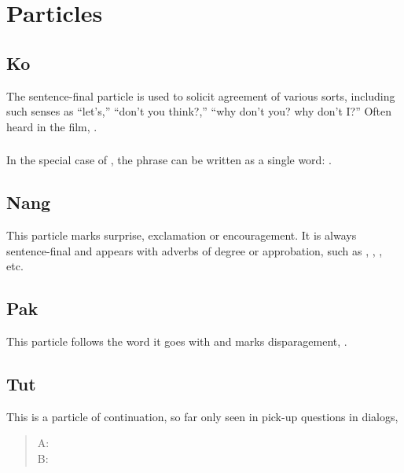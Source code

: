 {\section{Particles}

\subsection{Ko} The sentence-final particle  is used to solicit
agreement of various sorts, including such senses as ``let's,''
``don't you think?,'' ``why don't you? why don't I?''  Often heard in
the film,  .
\label{syn:particle:ko}

\subsubsection{} In the special case of  , 
the phrase can be written as a single word: .

\subsection{Nang} This particle marks surprise, exclamation or
encouragement.  It is always sentence-final and appears with adverbs
of degree or approbation, such as , ,
, etc. 
   

\subsection{Pak} This particle follows the word it goes with and marks
disparagement,  .

\subsection{Tut} This is a particle of continuation, so far only seen
in pick-up questions in dialogs, 

\begin{quotation}
\noindent A:   \\
\noindent B:  
\end{quotation}

}
